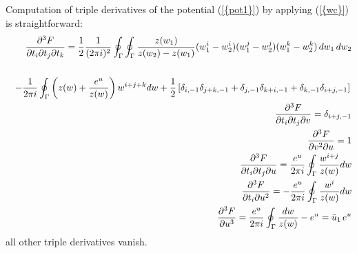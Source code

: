 \documentclass[numbook, envcountsame, envcountreset]{svjour3}
\begin{document}
{} Computation of triple derivatives
of the potential {(\ref{{pot1}})} by applying {(\ref{{wc}})} is straightforward:
\begin{eqnarray}\label{trip}
&&
\frac{{\partial}^3F}{{\partial} t_i {\partial} t_j{\partial} t_k}=\frac12 \frac1{(2\pi i)^2} \oint_\Gamma\oint_\Gamma
\frac{z(w_1)}{z(w_2)-z(w_1)}(w_1^i-w_2^i)(w_1^j-w_2^j)(w_1^k-w_2^k) \, dw_1\, dw_2
{\nonumber}\\
&&
\\
&&
-\frac1{2\pi i} \oint_\Gamma \left( z(w) +\frac{e^u}{z(w)}\right) w^{i+j+k} dw + \frac12 \left[\delta_{i,-1} \delta_{j+k,-1} + \delta_{j,-1} \delta_{k+i, -1} +\delta_{k,-1} \delta_{i+j,-1}\right]
{\nonumber}\\
&&
\frac{{\partial}^3F}{{\partial} t_i {\partial} t_j{\partial} v} =\delta_{i+j,-1}
{\nonumber}\\
&&
\frac{{\partial}^3 F}{{\partial} v^2{\partial} u}=1
{\nonumber}\\
&&
\frac{{\partial}^3F}{{\partial} t_i {\partial} t_j{\partial} u} =\frac{e^u}{2\pi i} \oint_\Gamma \frac{w^{i+j}}{z(w)} dw
{\nonumber}\\
&&
\frac{{\partial}^3F}{{\partial} t_i {\partial} u^2}=-\frac{e^u}{2\pi i} \oint_\Gamma \frac{w^{i}}{z(w)} dw
{\nonumber}\\
&&
\frac{{\partial}^3F}{{\partial} u^3} =\frac{e^u}{2\pi i} \oint_\Gamma \frac{dw}{z(w)}  -e^u= \bar u_1 \, e^u
{\nonumber}
\end{eqnarray}
all other triple derivatives vanish.
\end{document}
